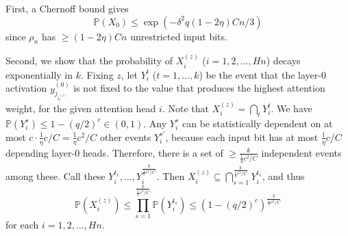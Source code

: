 \documentclass[11pt,a4paper]{article}
\newcommand{\Prob}{\mathbb{P}}%
\begin{document}
First, a Chernoff bound gives~\cite[Theorem 4.4]{mitzenmacherprobability}
\begin{equation}
\Prob(X_0) \leq    \exp\left(-\delta^2q(1-2\eta)Cn / 3\right)
\end{equation}
since $\rho_n$ has $\geq (1-2\eta)Cn$ unrestricted input bits.

Second, we show that the probability of $X_i^{(z)}$ ($i=1,2,\dots, Hn$) decays exponentially in $k$.
Fixing $z$, let $Y_i^t$ ($t=1,\dots,k$) be the event that the layer-0 activation $y_{j_{i_t^{(z)}}}^{(0)}$ is not fixed to the value that produces the highest attention weight, for the given attention head $i$.
Note that $X_i^{(z)} = \bigcap_t Y_i^t$.
We have $\Prob(Y_i^s) \leq 1-(q/2)^c \in (0,1)$. 
Any $Y_i^s$ can be statistically dependent on at most $c \cdot \frac{1}{\eta}c/C = \frac{1}{\eta}c^2/C$ other events $Y_i^{s'}$, because each input bit has at most $\frac{1}{\eta} c/C$ depending layer-0 heads.
Therefore, there is a set of $\geq \frac{k}{\frac{1}{\eta}c^2/C}$ independent events among these.
Call these $Y_i^{t_1}, \dots, Y_i^{\frac{k}{\frac{1}{\eta}c^2/C}}$.
Then $X_i^{(z)} \subseteq \bigcap_{s=1}^{\frac{k}{\frac{1}{\eta}c^2/C}} Y_i^{t_s}$, and thus
\begin{equation}
\Prob(X_i^{(z)}) \leq \prod_{s=1}^{\frac{k}{\frac{1}{\eta}c^2/C}} \Prob(Y_i^{t_s}) \leq \left(1-(q/2)^c\right)^{\frac{k}{\frac{1}{\eta}c^2/C}}
\end{equation}
for each $i=1, 2, \dots, Hn$.
\end{document}
